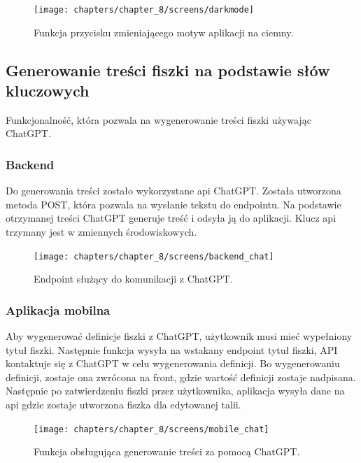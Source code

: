 \begin{figure}[H]
    \centering
    \texttt{[image: chapters/chapter\_8/screens/darkmode]}
    \caption{Funkcja przycisku zmieniającego motyw aplikacji na ciemny.}
    \label{img:darkmode}
\end{figure}

\subsection{Generowanie treści fiszki na podstawie słów kluczowych}
Funkcjonalność, która pozwala na wygenerowanie treści fiszki używając ChatGPT.

\subsubsection{Backend}
Do generowania treści zostało wykorzystane api ChatGPT. Została utworzona metoda POST, która pozwala na wysłanie tekstu do endpointu. Na podstawie otrzymanej treści ChatGPT generuje treść i odsyła ją do aplikacji. Klucz api trzymany jest w zmiennych środowiskowych.

\begin{figure}[H]
    \centering
    \texttt{[image: chapters/chapter\_8/screens/backend\_chat]}
    \caption{Endpoint służący do komunikacji z ChatGPT.}
    \label{img:backend_chat}
\end{figure}

\subsubsection{Aplikacja mobilna}
Aby wygenerować definicje fiszki z ChatGPT, użytkownik musi mieć wypełniony tytuł fiszki. Następnie funkcja wysyła na wstakany endpoint tytuł fiszki, API kontaktuje się z ChatGPT w celu wygenerowania definicji. Bo wygenerowaniu definicji, zostaje ona zwrócona na front, gdzie wartość definicji zostaje nadpisana. Następnie po zatwierdzeniu fiszki przez użytkownika, aplikacja wysyła dane na api gdzie zostaje utworzona fiszka dla edytowanej talii.

\begin{figure}[H]
    \centering
    \texttt{[image: chapters/chapter\_8/screens/mobile\_chat]}
    \caption{Funkcja obsługująca generowanie treści za pomocą ChatGPT.}
    \label{img:mobile_chat_1}
\end{figure}


